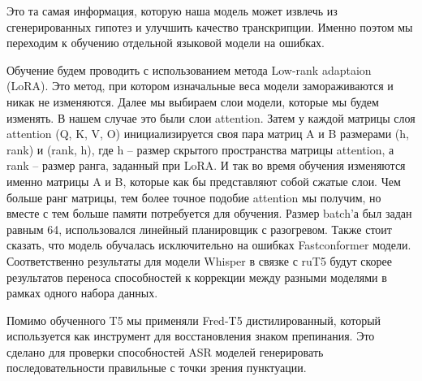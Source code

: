 Это та самая информация, которую наша модель может извлечь из сгенерированных гипотез и улучшить качество транскрипции.
Именно поэтом мы переходим к обучению отдельной языковой модели на ошибках.

Обучение будем проводить с использованием метода Low-rank adaptaion (LoRA).
Это метод, при котором изначальные веса модели замораживаются и никак не изменяются.
Далее мы выбираем слои модели, которые мы будем изменять. В нашем случае это были слои attention.
Затем у каждой матрицы слоя attention (Q, K, V, O) инициализируется своя пара матриц A и B размерами (h, rank) и (rank, h), где h – размер скрытого пространства матрицы attention, а rank – размер ранга, заданный при LoRA.
И так во время обучения изменяются именно матрицы A и B, которые как бы представляют собой сжатые слои. Чем больше ранг матрицы, тем более точное подобие attention мы получим, но вместе с тем больше памяти потребуется для обучения. Размер batch'а был задан равным 64, использовался линейный планировщик с разогревом.
Также стоит сказать, что модель обучалась исключительно на ошибках Fastconformer модели.
Соответственно результаты для модели Whisper в связке с ruT5 будут скорее результатов переноса способностей к коррекции между разными моделями в рамках одного набора данных.

Помимо обученного T5 мы применяли Fred-T5 дистилированный, который используется как инструмент для восстановления знаком препинания.
Это сделано для проверки способностей ASR моделей генерировать последовательности правильные с точки зрения пунктуации.

